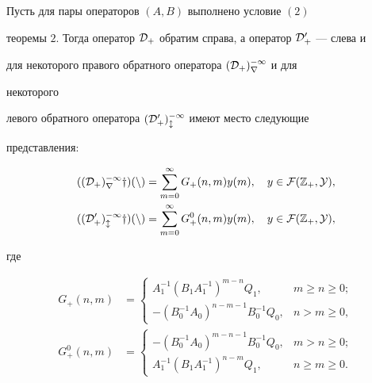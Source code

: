 \begin{thm} 


Пусть для пары операторов $(A,B)$ выполнено условие $(2)$ 


теоремы $2$. Тогда оператор $\cal D_+$ обратим справа, а оператор $\cal 


D^0_+$ --- слева и 


для некоторого правого обратного оператора $(\cal D_+)^{-1}_r$ и для 


некоторого 


левого обратного оператора $(\cal D^0_+)^{-1}_l$ имеют место следующие 


представления\/$:$ 


\begin{align} 


((\cal D_+)^{-1}_r y)(n)&=\sum^\infty_{m=0} 


G_+(n,m)y(m),\quad y\in\cal F(\Bbb Z_+,Y),\\ 


((\cal D^0_+)^{-1}_l y)(n)&=\sum^\infty_{m=0} 


G^0_+(n,m)y(m),\quad y\in\cal F(\Bbb Z_+,Y), 


\end{align} 


где 


\begin{align*} 


G_+(n,m)&= 


\begin{cases} 


A^{-1}_1(B_1A^{-1}_1)^{m-n}Q_1, & m\ge n\ge0;\\ 


-(B^{-1}_0A_0)^{n-m-1}B^{-1}_0Q_0, & n>m\ge0, 


\end{cases} 


\\ 


G^0_+(n,m)&= 


\begin{cases} 


-(B^{-1}_0A_0)^{m-n-1}B^{-1}_0Q_0, & m>n\ge0;\\ 


A^{-1}_1(B_1A^{-1}_1)^{n-m}Q_1, & n\ge m\ge0. 


\end{cases} 


\end{align*} 


\end{thm} 


